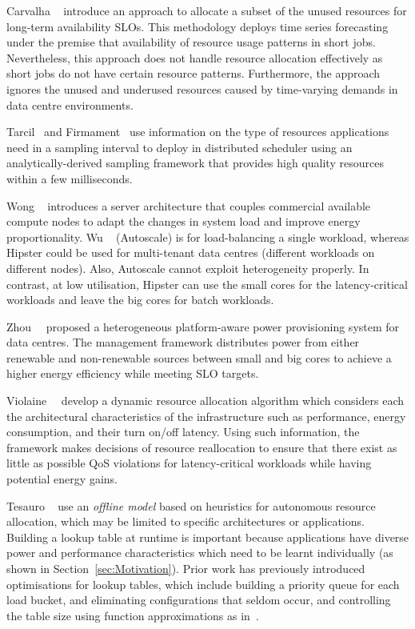 Carvalha \etal~\citep{43017} introduce an approach to allocate a subset of the unused
resources for long-term availability SLOs. This methodology deploys time series
forecasting under the premise that availability of resource usage patterns in short jobs.
Nevertheless, this approach does not handle resource allocation effectively as short jobs
do not have certain resource patterns. Furthermore, the approach ignores the unused and
    underused resources caused by time-varying demands in data centre environments.  
 
Tarcil~\citep{Delimitrou:2015:TRS:2806777.2806779} and Firmament~\citep{199390} use
information on the type of resources applications need in a sampling interval to deploy in
distributed scheduler using an analytically-derived sampling framework that provides high
quality resources within a few milliseconds. 


 Wong \etal~\citep{Wong2012KnightShift:Heterogeneity} introduces a server architecture
that couples commercial available compute nodes to adapt the changes in system load and
improve energy proportionality.  Wu \etal~\citep{QiangWuMakingHttps://goo.gl/vJi1kf} (Autoscale) is
for load-balancing a single workload, whereas Hipster could be used for multi-tenant data
centres (different workloads on different nodes). Also, Autoscale cannot exploit
heterogeneity properly. In contrast, at low utilisation, Hipster can use the small cores
for the latency-critical workloads and leave the big cores for batch workloads.
    
Zhou~\etal~\citep{Zhou:2016:GLM:2925426.2926272} proposed a heterogeneous platform-aware
power provisioning system for data centres. The management framework distributes power
from either renewable and non-renewable sources between small and big cores to achieve a
higher energy efficiency while meeting SLO targets.

Violaine~\etal~\citep{villebonnet:hal-01355452} develop a dynamic resource allocation
algorithm which considers each the architectural characteristics of the infrastructure
such as performance, energy consumption, and their turn on/off latency. Using such
information, the framework makes decisions of resource reallocation to ensure that there
exist as little as possible QoS violations for latency-critical workloads while having
potential energy gains.


 Tesauro \etal~\citep{TesauroAAllocation} use an \emph{offline model} based on heuristics
for autonomous resource allocation, which may be limited to specific architectures or
applications. Building a lookup table at runtime is important because applications have
diverse power and performance characteristics which need to be learnt individually (as
shown in Section~\ref{sec:Motivation}). Prior work has previously introduced optimisations
for lookup tables, which include building a priority queue for each load bucket, and
eliminating configurations that seldom occur, and controlling the table size using
function approximations as in~\citep{Vamanan2015TimeTrader:Search,Ipek:2008:SMC:1381306.1382172}.


